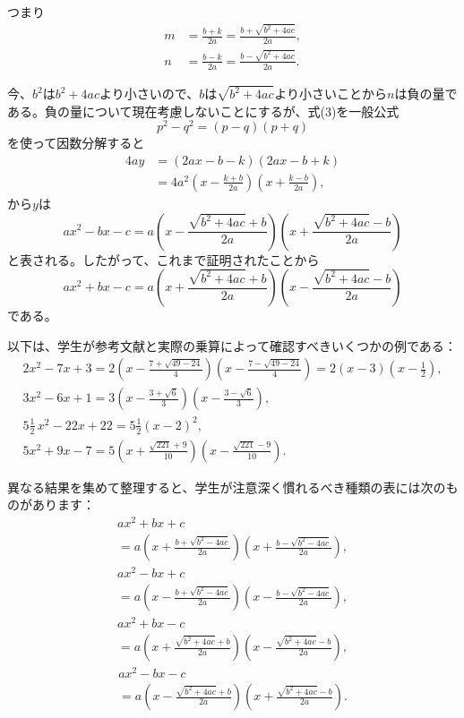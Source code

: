 \documentclass[a4paper,11pt,openany]{ltjsbook}
\newcommand{\Add}[1]{#1}
\begin{document}
つまり
\begin{align*}
m &= \frac{b + k}{2a} = \frac{b + \sqrt{b^{2} + 4ac}}{2a} \Add{,} \\
n &= \frac{b - k}{2a} = \frac{b - \sqrt{b^{2} + 4ac}}{2a}.
\end{align*}

今、$b^{2}$は$b^{2} + 4ac$より小さいので、$b$は$\sqrt{b^{2} + 4ac}$より小さいことから$n$は負の量である。負の量について現在考慮しないことにするが、式(3)を一般公式
\[
p^{2} - q^{2} = (p - q)(p + q)
\]
を使って因数分解すると
\begin{align*}
4ay &= (2ax - b - k)(2ax - b + k) \\
  &= 4a^{2}\left(x - \frac{k + b}{2a}\right)\left(x + \frac{k - b}{2a}\right),
\end{align*}
から$y$は
\[
ax^{2} - bx - c = a\left(x - \frac{\sqrt{b^{2} + 4ac} + b}{2a}\right)\left(x + \frac{\sqrt{b^{2} + 4ac} - b}{2a}\right)
\]
と表される。したがって、これまで証明されたことから
\[
ax^{2} + bx - c = a\left(x + \frac{\sqrt{b^{2} + 4ac} + b}{2a}\right)\left(x - \frac{\sqrt{b^{2} + 4ac} - b}{2a}\right)
\]
である。

以下は、学生が参考文献と実際の乗算によって確認すべきいくつかの例である：
\begin{gather*}
2x^{2} - 7x + 3 = 2\left(x - \frac{7 + \sqrt{49 - 24}}{4}\right)\left(x - \frac{7 - \sqrt{49 - 24}}{4}\right) = 2(x - 3)\left(x - \frac{1}{2}\right),\\
3x^{2} - 6x + 1 = 3\left(x - \frac{3 + \sqrt{6}}{3}\right)\left(x - \frac{3 - \sqrt{6}}{3}\right),\\
5\tfrac{1}{2}\, x^{2} - 22x + 22 = 5\tfrac{1}{2}(x - 2)^{2},\\
5x^{2} + 9x - 7 = 5\left(x + \frac{\sqrt{221} + 9}{10}\right)\left(x - \frac{\sqrt{221} - 9}{10}\right).
\end{gather*}

異なる結果を集めて整理すると、学生が注意深く慣れるべき種類の表には次のものがあります：
\begin{multline*}
ax^{2} + bx + c \\
  = a\left(x + \frac{b + \sqrt{b^{2} - 4ac}}{2a}\right)
     \left(x + \frac{b - \sqrt{b^{2} - 4ac}}{2a}\right)\Add{,}
\tag{(A)}
\end{multline*}
\begin{multline*}
ax^{2} - bx + c \\
  = a\left(x - \frac{b + \sqrt{b^{2} - 4ac}}{2a}\right)
     \left(x - \frac{b - \sqrt{b^{2} - 4ac}}{2a}\right)\Add{,}
\tag{(B)}
\end{multline*}
\begin{multline*}
ax^{2} + bx - c \\
  = a\left(x + \frac{\sqrt{b^{2} + 4ac} + b}{2a}\right)
     \left(x - \frac{\sqrt{b^{2} + 4ac} - b}{2a}\right)\Add{,}
\tag{(C)}
\end{multline*}
\begin{multline*}
ax^{2} - bx - c \\
  = a\left(x - \frac{\sqrt{b^{2} + 4ac} + b}{2a}\right)
     \left(x + \frac{\sqrt{b^{2} + 4ac} - b}{2a}\right)\Add{.}
\tag{(D)}
\end{multline*}
\end{document}

